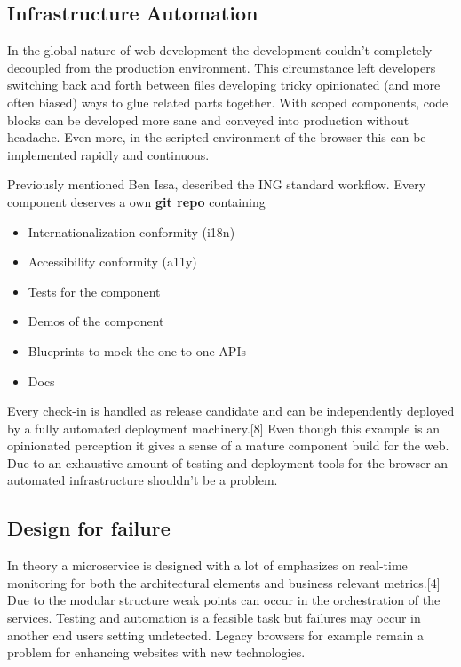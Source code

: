 \documentclass[]{article}
\providecommand{\tightlist}{%
  \setlength{\itemsep}{0pt}\setlength{\parskip}{0pt}}
\begin{document}
\subsection{Infrastructure Automation}\label{infrastructure-automation}

In the global nature of web development the development couldn't
completely decoupled from the production environment. This circumstance
left developers switching back and forth between files developing tricky
opinionated (and more often biased) ways to glue related parts together.
With scoped components, code blocks can be developed more sane and
conveyed into production without headache. Even more, in the scripted
environment of the browser this can be implemented rapidly and
continuous.

Previously mentioned Ben Issa, described the ING standard workflow.
Every component deserves a own \textbf{git repo} containing

\begin{itemize}
\tightlist
\item
  Internationalization conformity (i18n)
\item
  Accessibility conformity (a11y)
\item
  Tests for the component
\item
  Demos of the component
\item
  Blueprints to mock the one to one APIs
\item
  Docs
\end{itemize}

Every check-in is handled as release candidate and can be independently
deployed by a fully automated deployment machinery.{[}8{]} Even though
this example is an opinionated perception it gives a sense of a mature
component build for the web. Due to an exhaustive amount of testing and
deployment tools for the browser an automated infrastructure shouldn't
be a problem.

\subsection{Design for failure}\label{design-for-failure}

In theory a microservice is designed with a lot of emphasizes on
real-time monitoring for both the architectural elements and business
relevant metrics.{[}4{]} Due to the modular structure weak points can
occur in the orchestration of the services. Testing and automation is a
feasible task but failures may occur in another end users setting
undetected. Legacy browsers for example remain a problem for enhancing
websites with new technologies.
\end{document}
